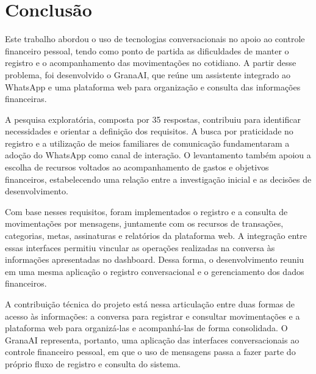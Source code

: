 \chapter{Conclusão}
\label{cap:conclusao}

Este trabalho abordou o uso de tecnologias conversacionais no apoio ao controle financeiro pessoal, tendo como ponto de partida as dificuldades de manter o registro e o acompanhamento das movimentações no cotidiano. A partir desse problema, foi desenvolvido o GranaAI, que reúne um assistente integrado ao WhatsApp e uma plataforma web para organização e consulta das informações financeiras.

A pesquisa exploratória, composta por 35 respostas, contribuiu para identificar necessidades e orientar a definição dos requisitos. A busca por praticidade no registro e a utilização de meios familiares de comunicação fundamentaram a adoção do WhatsApp como canal de interação. O levantamento também apoiou a escolha de recursos voltados ao acompanhamento de gastos e objetivos financeiros, estabelecendo uma relação entre a investigação inicial e as decisões de desenvolvimento.

Com base nesses requisitos, foram implementados o registro e a consulta de movimentações por mensagens, juntamente com os recursos de transações, categorias, metas, assinaturas e relatórios da plataforma web. A integração entre essas interfaces permitiu vincular as operações realizadas na conversa às informações apresentadas no dashboard. Dessa forma, o desenvolvimento reuniu em uma mesma aplicação o registro conversacional e o gerenciamento dos dados financeiros.

A contribuição técnica do projeto está nessa articulação entre duas formas de acesso às informações: a conversa para registrar e consultar movimentações e a plataforma web para organizá-las e acompanhá-las de forma consolidada. O GranaAI representa, portanto, uma aplicação das interfaces conversacionais ao controle financeiro pessoal, em que o uso de mensagens passa a fazer parte do próprio fluxo de registro e consulta do sistema.
